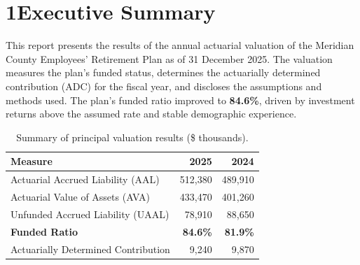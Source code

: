 \section{1\quad Executive Summary}
This report presents the results of the annual actuarial valuation of the Meridian County
Employees' Retirement Plan as of 31 December 2025. The valuation measures the plan's funded
status, determines the actuarially determined contribution (ADC) for the fiscal year, and
discloses the assumptions and methods used. The plan's funded ratio improved to
\textbf{84.6\%}, driven by investment returns above the assumed rate and stable demographic
experience.

\begin{table}[ht]\centering
\caption{Summary of principal valuation results (\$ thousands).}
\begin{tabularx}{\linewidth}{@{}X R R@{}}
\toprule
\textbf{Measure} & \textbf{2025} & \textbf{2024}\\
\midrule
Actuarial Accrued Liability (AAL) & 512{,}380 & 489{,}910\\
Actuarial Value of Assets (AVA)   & 433{,}470 & 401{,}260\\
Unfunded Accrued Liability (UAAL) & \phantom{0}78{,}910 & \phantom{0}88{,}650\\
\textbf{Funded Ratio}             & \textbf{84.6\%} & \textbf{81.9\%}\\
Actuarially Determined Contribution & \phantom{00}9{,}240 & \phantom{00}9{,}870\\
\bottomrule
\end{tabularx}
\end{table}
